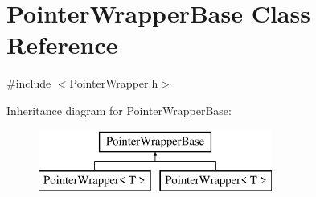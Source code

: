 \hypertarget{classPointerWrapperBase}{\section{Pointer\-Wrapper\-Base Class Reference}
\label{classPointerWrapperBase}
}


{\ttfamily \#include $<$Pointer\-Wrapper.\-h$>$}

Inheritance diagram for Pointer\-Wrapper\-Base\-:\begin{figure}[H]
\begin{center}
\leavevmode
\includegraphics[height=2.000000cm]{classPointerWrapperBase}
\end{center}
\end{figure}
